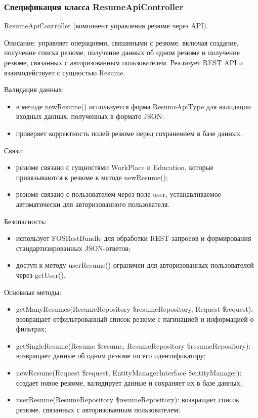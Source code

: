 \subsubsection{Спецификация класса ResumeApiController}

ResumeApiController (компонент управления резюме через API).

Описание: управляет операциями, связанными с резюме, включая создание, получение списка резюме, получение данных об одном резюме и получение резюме, связанных с авторизованным пользователем. Реализует REST API и взаимодействует с сущностью Resume.

Валидация данных:
\begin{itemize}
	\item в методе newResume() используется форма ResumeApiType для валидации входных данных, полученных в формате JSON;
	\item проверяет корректность полей резюме перед сохранением в базе данных.
\end{itemize}

Связи:
\begin{itemize}
	\item резюме связано с сущностями WorkPlace и Education, которые привязываются к резюме в методе newResume();
	\item резюме связано с пользователем через поле user, устанавливаемое автоматически для авторизованного пользователя.
\end{itemize}

Безопасность:
\begin{itemize}
	\item использует FOSRestBundle для обработки REST-запросов и формирования стандартизированных JSON-ответов;
	\item доступ к методу userResume() ограничен для авторизованных пользователей через getUser().
\end{itemize}

Основные методы:
\begin{itemize}
	\item getManyResumes(ResumeRepository \$resumeRepository, Request \$request): возвращает отфильтрованный список резюме с пагинацией и информацией о фильтрах;
	\item getSingleResume(Resume \$resume, ResumeRepository \$resumeRepository): возвращает данные об одном резюме по его идентификатору;
	\item newResume(Request \$request, EntityManagerInterface \$entityManager): создает новое резюме, валидирует данные и сохраняет их в базе данных;
	\item userResume(ResumeRepository \$resumeRepository): возвращает список резюме, связанных с авторизованным пользователем;
\end{itemize}

